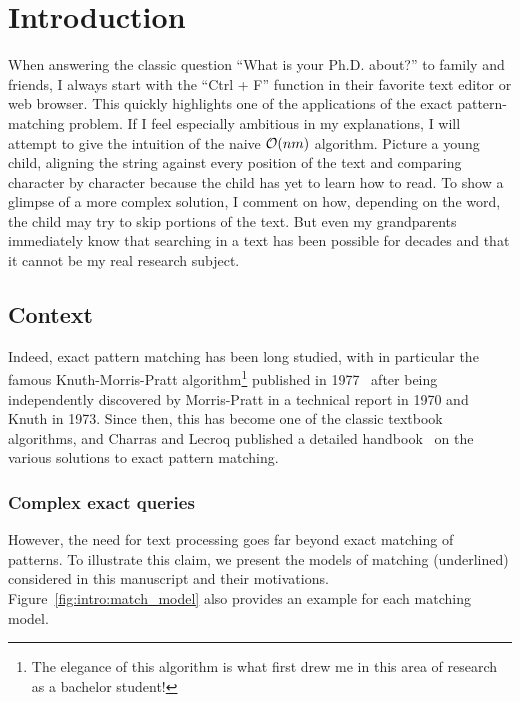 \chapter*{Introduction}\label{chap:intro}

When answering the classic question ``What is your Ph.D. about?'' to family and friends, I always start with the ``Ctrl + F'' function in their favorite text editor or web browser. This quickly highlights one of the applications of the exact pattern-matching problem. If I feel especially ambitious in my explanations, I will attempt to give the intuition of the naive $\mathcal{O}(nm)$ algorithm. Picture a young child, aligning the string against every position of the text and comparing character by character because the child has yet to learn how to read. To show a glimpse of a more complex solution, I comment on how, depending on the word, the child may try to skip portions of the text. But even my grandparents immediately know that searching in a text has been possible for decades and that it cannot be my real research subject.

\section{Context}

Indeed, exact pattern matching has been long studied, with in particular the famous Knuth-Morris-Pratt algorithm\footnote{The elegance of this algorithm is what first drew me in this area of research as a bachelor student!} published in 1977~\cite{KMP} after being independently discovered by Morris-Pratt in a technical report in 1970 and Knuth in 1973. Since then, this has become one of the classic textbook algorithms, and Charras and Lecroq published a detailed handbook~\cite{charras2004handbook} on the various solutions to exact pattern matching.

\subsection{Complex exact queries} 



However, the need for text processing goes far beyond exact matching of patterns. To illustrate this claim, we present the models of matching (underlined) considered in this manuscript and their motivations. Figure~\ref{fig:intro:match_model} also provides an example for each matching model.

